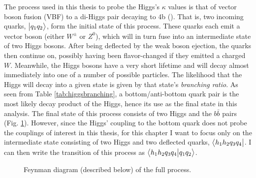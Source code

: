    The process used in this thesis to probe the Higgs's $\kappa$ values is that of
        vector boson fusion (VBF) to a di-Higgs pair decaying to 4b (\vbfhhproc).
    That is, two incoming quarks, $\big| q_1 q_2 \big>$, form the initial state of this process.
    These quarks each emit a vector boson (either $W^{\pm}$ or $Z^0$), 
        which will in turn fuse into an intermediate state of two Higgs bosons.
    After being deflected by the weak boson ejection, the quarks then continue on,
        possibly having been flavor-changed if they emitted a charged $W$.
    Meanwhile, the Higgs bosons have a very short lifetime and will decay almost immediately into one of a number of possible particles.
    The likelihood that the Higgs will decay into a given state is given by that state's \textit{branching ratio}.
    As seen from Table \ref{tab:higgsbranching}, a bottom/anti-bottom quark pair is the most likely decay product of the Higgs,
        hence its use as the final state in this analysis.
    The final state of this process consists of two Higgs and the $b \bar{b}$ pairs (Fig. \ref{fig:tree_level_vbfhh4b}).
    However, since the Higgs' coupling to the bottom quark does not probe the couplings of interest in this thesis,
        for this chapter I want to focus only on the intermediate state
        consisting of two Higgs and two deflected quarks,
            $\big< h_1 h_2 q_3 q_4 \big|$.
    I can then write the transition of this process as $\big<  h_1 h_2 q_3 q_4 \big| q_1 q_2 \big>$.

    \begin{figure} \centering
         
        \label{fig:tree_level_vbfhh4b}
    \caption{Feynman diagram (described below) of the full \vbfhhproc process.}
    \end{figure}

    


